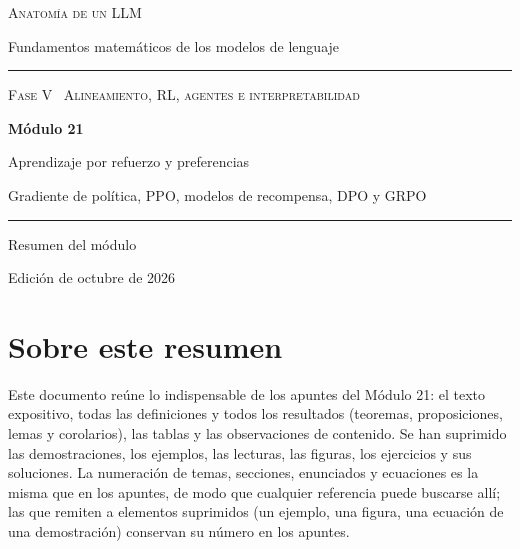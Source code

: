 \documentclass[11pt,a4paper,twoside,openany]{book}
\begin{document}
\frontmatter
\begin{titlepage}
\centering
\vspace*{2.5cm}
{\large\scshape Anatomía de un LLM}\par
\vspace{0.4cm}
{\normalsize Fundamentos matemáticos de los modelos de lenguaje}\par
\vspace{2.2cm}
\rule{\textwidth}{0.8pt}\par\vspace{0.5cm}
{\small\scshape Fase V \textperiodcentered\ Alineamiento, RL, agentes e interpretabilidad}\par\vspace{0.3cm}
{\Huge\bfseries Módulo 21\par}\vspace{0.3cm}
{\LARGE Aprendizaje por refuerzo y preferencias\par}
\vspace{0.2cm}
{\large Gradiente de política, PPO, modelos de recompensa, DPO y GRPO\par}
\vspace{0.5cm}\rule{\textwidth}{0.4pt}\par
\vspace{1.6cm}
{\large Resumen del módulo}\par
\vfill
{\small Edición de octubre de 2026}\par
\end{titlepage}

\chapter*{Sobre este resumen}

Este documento reúne lo indispensable de los apuntes del Módulo 21: el texto expositivo, todas las definiciones y todos los resultados (teoremas, proposiciones, lemas y corolarios), las tablas y las observaciones de contenido. Se han suprimido las demostraciones, los ejemplos, las lecturas, las figuras, los ejercicios y sus soluciones. La numeración de temas, secciones, enunciados y ecuaciones es la misma que en los apuntes, de modo que cualquier referencia puede buscarse allí; las que remiten a elementos suprimidos (un ejemplo, una figura, una ecuación de una demostración) conservan su número en los apuntes.
\end{document}
